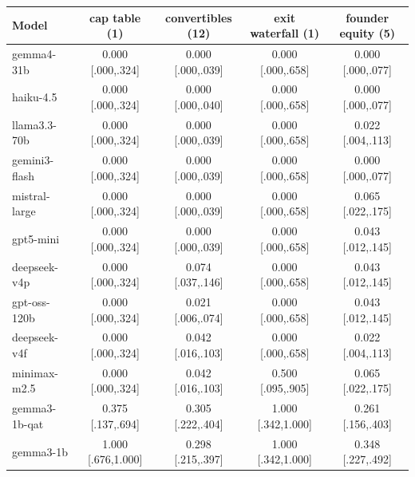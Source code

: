 \begin{table}[t]
\centering
\scriptsize
\setlength{\tabcolsep}{4pt}
\begin{tabular}{lcccc}
\toprule
Model & cap table (1) & convertibles (12) & exit waterfall (1) & founder equity (5) \\
\midrule
gemma4-31b & 0.000 [.000,.324] & 0.000 [.000,.039] & 0.000 [.000,.658] & 0.000 [.000,.077] \\
haiku-4.5 & 0.000 [.000,.324] & 0.000 [.000,.040] & 0.000 [.000,.658] & 0.000 [.000,.077] \\
llama3.3-70b & 0.000 [.000,.324] & 0.000 [.000,.039] & 0.000 [.000,.658] & 0.022 [.004,.113] \\
gemini3-flash & 0.000 [.000,.324] & 0.000 [.000,.039] & 0.000 [.000,.658] & 0.000 [.000,.077] \\
mistral-large & 0.000 [.000,.324] & 0.000 [.000,.039] & 0.000 [.000,.658] & 0.065 [.022,.175] \\
gpt5-mini & 0.000 [.000,.324] & 0.000 [.000,.039] & 0.000 [.000,.658] & 0.043 [.012,.145] \\
deepseek-v4p & 0.000 [.000,.324] & 0.074 [.037,.146] & 0.000 [.000,.658] & 0.043 [.012,.145] \\
gpt-oss-120b & 0.000 [.000,.324] & 0.021 [.006,.074] & 0.000 [.000,.658] & 0.043 [.012,.145] \\
deepseek-v4f & 0.000 [.000,.324] & 0.042 [.016,.103] & 0.000 [.000,.658] & 0.022 [.004,.113] \\
minimax-m2.5 & 0.000 [.000,.324] & 0.042 [.016,.103] & 0.500 [.095,.905] & 0.065 [.022,.175] \\
gemma3-1b-qat & 0.375 [.137,.694] & 0.305 [.222,.404] & 1.000 [.342,1.000] & 0.261 [.156,.403] \\
gemma3-1b & 1.000 [.676,1.000] & 0.298 [.215,.397] & 1.000 [.342,1.000] & 0.348 [.227,.492] \\
\bottomrule
\end{tabular}

\vspace{4pt}


\end{table}
